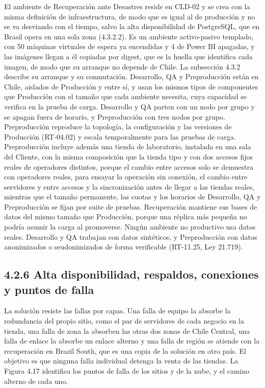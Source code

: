 \documentclass[11pt]{article}
\begin{document}
El ambiente de Recuperación ante Desastres reside en CLD-02 y se crea con la misma definición de infraestructura, de modo que es igual al de producción y no se va desviando con el tiempo, salvo la alta disponibilidad de PostgreSQL, que en Brasil opera en una sola zona (4.3.2.2). Es un ambiente activo-pasivo templado, con 50 máquinas virtuales de espera ya encendidas y 4 de Power BI apagadas, y las imágenes llegan a él copiadas por digest, que es la huella que identifica cada imagen, de modo que su arranque no depende de Chile. La subsección 4.3.2 describe su arranque y su conmutación. Desarrollo, QA y Preproducción están en Chile, aislados de Producción y entre sí, y usan los mismos tipos de componentes que Producción con el tamaño que cada ambiente necesita, cuya capacidad se verifica en la prueba de carga. Desarrollo y QA parten con un nodo por grupo y se apagan fuera de horario, y Preproducción con tres nodos por grupo. Preproducción reproduce la topología, la configuración y las versiones de Producción (RT-04.02) y escala temporalmente para las pruebas de carga. Preproducción incluye además una tienda de laboratorio, instalada en una sala del Cliente, con la misma composición que la tienda tipo y con dos accesos fijos reales de operadores distintos, porque el cambio entre accesos solo se demuestra con operadores reales, para ensayar la operación sin conexión, el cambio entre servidores y entre accesos y la sincronización antes de llegar a las tiendas reales, mientras que el tamaño permanente, las cuotas y los horarios de Desarrollo, QA y Preproducción se fijan por suite de pruebas. Recuperación mantiene sus bases de datos del mismo tamaño que Producción, porque una réplica más pequeña no podría asumir la carga al promoverse. Ningún ambiente no productivo usa datos reales. Desarrollo y QA trabajan con datos sintéticos, y Preproducción con datos anonimizados o seudonimizados de forma verificable (RT-11.25, Ley 21.719).

\subsection{4.2.6 Alta disponibilidad, respaldos, conexiones y puntos de falla}

La solución resiste las fallas por capas. Una falla de equipo la absorbe la redundancia del propio sitio, como el par de servidores de cada negocio en la tienda, una falla de zona la absorben las otras dos zonas de Chile Central, una falla de enlace la absorbe un enlace alterno y una falla de región se atiende con la recuperación en Brazil South, que es una copia de la solución en otro país. El objetivo es que ninguna falla individual detenga la venta de las tiendas. La Figura 4.17 identifica los puntos de falla de los sitios y de la nube, y el camino alterno de cada uno.
\end{document}
